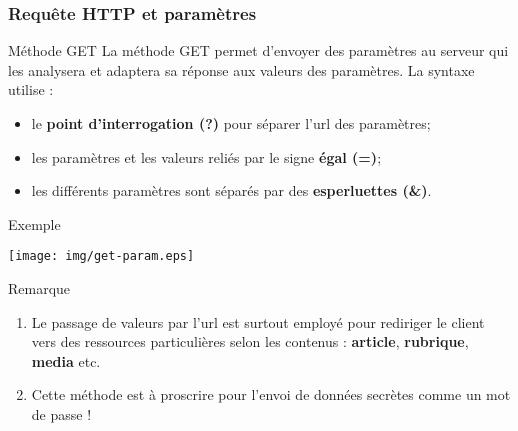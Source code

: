 \documentclass[8pt]{beamer}
\newcounter{num}
\begin{document}
\begin{frame}
\frametitle{Requête HTTP et paramètres}

\begin{block}{Méthode GET}
La méthode GET permet d'envoyer des paramètres au serveur qui les analysera et adaptera sa réponse aux valeurs des paramètres. 
La syntaxe utilise :
\begin{itemize}
\item le \textbf{point d'interrogation (?)} pour séparer l'url des paramètres;
\item les paramètres et les valeurs reliés par le signe \textbf{égal (=)};
\item les différents paramètres sont séparés par des \textbf{esperluettes (\&)}.
\end{itemize}
\end{block}

\begin{exampleblock}{Exemple}
\begin{center}
\texttt{[image: img/get-param.eps]}
\end{center}
\end{exampleblock}

\begin{alertblock}{Remarque}
\begin{enumerate}
\item Le passage de valeurs par l'url est surtout employé pour rediriger le client vers des ressources particulières selon les contenus : \textbf{article}, \textbf{rubrique}, \textbf{media} etc.
\item Cette méthode est à proscrire pour l'envoi de données secrètes comme un mot de passe !
\end{enumerate}
\end{alertblock}
\end{frame}
\end{document}
